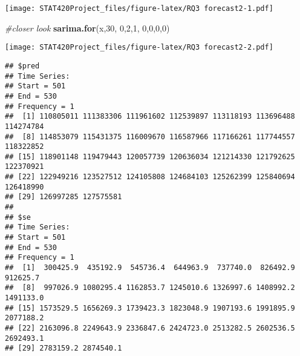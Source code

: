 \documentclass[]{article}
\newenvironment{Shaded}{\begin{snugshade}}{\end{snugshade}}
\newcommand{\CommentTok}[1]{\textcolor[rgb]{0.56,0.35,0.01}{\textit{#1}}}
\newcommand{\DataTypeTok}[1]{\textcolor[rgb]{0.13,0.29,0.53}{#1}}
\newcommand{\DecValTok}[1]{\textcolor[rgb]{0.00,0.00,0.81}{#1}}
\newcommand{\KeywordTok}[1]{\textcolor[rgb]{0.13,0.29,0.53}{\textbf{#1}}}
\newcommand{\NormalTok}[1]{#1}
\newcommand{\OperatorTok}[1]{\textcolor[rgb]{0.81,0.36,0.00}{\textbf{#1}}}
\newcommand{\StringTok}[1]{\textcolor[rgb]{0.31,0.60,0.02}{#1}}
\begin{document}
\begin{Shaded}
\end{Shaded}

\texttt{[image: STAT420Project\_files/figure-latex/RQ3 forecast2-1.pdf]}

\begin{Shaded}
\begin{Highlighting}[]
\CommentTok{#closer look}
\KeywordTok{sarima.for}\NormalTok{(x,}\DecValTok{30}\NormalTok{, }\DecValTok{0}\NormalTok{,}\DecValTok{2}\NormalTok{,}\DecValTok{1}\NormalTok{, }\DecValTok{0}\NormalTok{,}\DecValTok{0}\NormalTok{,}\DecValTok{0}\NormalTok{,}\DecValTok{0}\NormalTok{)}
\end{Highlighting}
\end{Shaded}

\texttt{[image: STAT420Project\_files/figure-latex/RQ3 forecast2-2.pdf]}

\begin{verbatim}
## $pred
## Time Series:
## Start = 501 
## End = 530 
## Frequency = 1 
##  [1] 110805011 111383306 111961602 112539897 113118193 113696488 114274784
##  [8] 114853079 115431375 116009670 116587966 117166261 117744557 118322852
## [15] 118901148 119479443 120057739 120636034 121214330 121792625 122370921
## [22] 122949216 123527512 124105808 124684103 125262399 125840694 126418990
## [29] 126997285 127575581
## 
## $se
## Time Series:
## Start = 501 
## End = 530 
## Frequency = 1 
##  [1]  300425.9  435192.9  545736.4  644963.9  737740.0  826492.9  912625.7
##  [8]  997026.9 1080295.4 1162853.7 1245010.6 1326997.6 1408992.2 1491133.0
## [15] 1573529.5 1656269.3 1739423.3 1823048.9 1907193.6 1991895.9 2077188.2
## [22] 2163096.8 2249643.9 2336847.6 2424723.0 2513282.5 2602536.5 2692493.1
## [29] 2783159.2 2874540.1
\end{verbatim}
\end{document}

